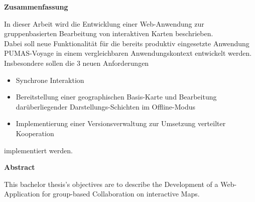 \begin{center}
\textbf{Zusammenfassung}
\end{center}

\noindent In dieser Arbeit wird die Entwicklung einer Web-Anwendung zur gruppenbasierten Bearbeitung von interaktiven Karten beschrieben.\\
Dabei soll neue Funktionalität für die bereits produktiv eingesetzte Anwendung PUMAS-Voyage in einem vergleichbaren Anwendungskontext entwickelt werden. Insbesondere sollen die 3 neuen Anforderungen
\begin{itemize}
\item Synchrone Interaktion
\item Bereitstellung einer geographischen Basis-Karte und Bearbeitung darüberliegender Darstellungs-Schichten im Offline-Modus
\item Implementierung einer Versionsverwaltung zur Umsetzung verteilter Kooperation
\end{itemize}
implementiert werden.

  \vspace{2cm}

\begin{center}
\textbf{Abstract}
\end{center}

\noindent This bachelor thesis's objectives are to describe the Development of a Web-Application for group-based
Collaboration on interactive Maps. 
